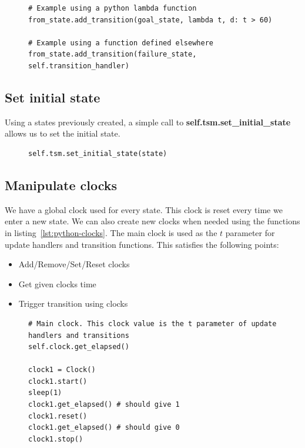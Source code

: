 \documentclass[12pt]{article}
\theoremstyle{definition}
\theoremstyle{definition}
\theoremstyle{remark}
\begin{document}
\begin{figure}[H]
    \begin{lstlisting}[caption="Add transition to any state",label={lst:python-add-transition}]
# Example using a python lambda function
from_state.add_transition(goal_state, lambda t, d: t > 60)

# Example using a function defined elsewhere
from_state.add_transition(failure_state, self.transition_handler)
    \end{lstlisting}
\end{figure}


\subsection{Set initial state}

Using a states previously created, a simple call to \textbf{self.tsm.set\_initial\_state} allows us to set the initial state.

\begin{figure}[H]
    \begin{lstlisting}[caption="Set the initial state",label={lst:python-set-initial-state}]
self.tsm.set_initial_state(state)
    \end{lstlisting}
\end{figure}


\subsection{Manipulate clocks}\label{ManipulateClocks}

We have a global clock used for every state. This clock is reset every time we enter a new state. We can also create new clocks when needed using the functions in listing~\ref{lst:python-clocks}. The main clock is used as the $t$ parameter for update handlers and transition functions. This satisfies the following points:
\begin{itemize}
\item Add/Remove/Set/Reset clocks
\item Get given clocks time
\item Trigger transition using clocks
\end{itemize}


\begin{figure}[H]
    \begin{lstlisting}[caption="Set the initial state",label={lst:python-clocks}]
# Main clock. This clock value is the t parameter of update handlers and transitions
self.clock.get_elapsed()

clock1 = Clock()
clock1.start()
sleep(1)
clock1.get_elapsed() # should give 1
clock1.reset()
clock1.get_elapsed() # should give 0
clock1.stop()
    \end{lstlisting}
\end{figure}
\end{document}
